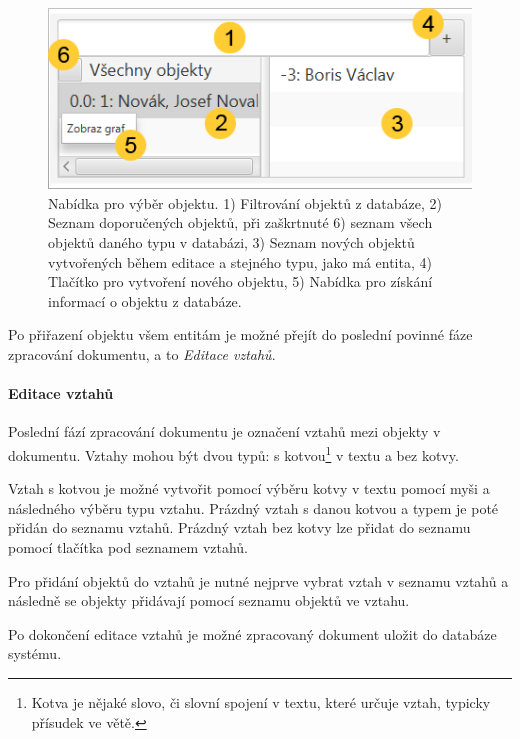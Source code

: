 \documentclass[12pt,a4paper]{report}
\begin{document}
\begin{figure}[!htb]
	\centering
	\includegraphics[width=\textwidth]{objekty}
	\caption{Nabídka pro výběr objektu. 1) Filtrování objektů z databáze, 2) Seznam doporučených objektů, při zaškrtnuté 6) seznam všech objektů daného typu v databázi, 3) Seznam nových objektů vytvořených během editace a stejného typu, jako má entita, 4) Tlačítko pro vytvoření nového objektu, 5) Nabídka pro získání informací o objektu z databáze.}
	\label{fig:Objekty}
\end{figure}

Po přiřazení objektu všem entitám je možné přejít do poslední povinné fáze zpracování dokumentu, a to \emph{Editace vztahů}.

\paragraph{Editace vztahů}
Poslední fází zpracování dokumentu je označení vztahů mezi objekty v dokumentu. Vztahy mohou být dvou typů: s kotvou\footnote{Kotva je nějaké slovo, či slovní spojení v textu, které určuje vztah, typicky přísudek ve větě.} v textu a bez kotvy.

Vztah s kotvou je možné vytvořit pomocí výběru kotvy v textu pomocí myši a následného výběru typu vztahu. Prázdný vztah s danou kotvou a typem je poté přidán do seznamu vztahů. Prázdný vztah bez kotvy lze přidat do seznamu pomocí tlačítka pod seznamem vztahů.

Pro přidání objektů do vztahů je nutné nejprve vybrat vztah v seznamu vztahů a následně se objekty přidávají pomocí seznamu objektů ve vztahu.

Po dokončení editace vztahů je možné zpracovaný dokument uložit do databáze systému.
\end{document}
